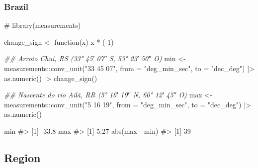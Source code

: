 \documentclass[
  12pt,
  a4paper,
  oneside]{tesesusp}
\newenvironment{Shaded}{\begin{snugshade}}{\end{snugshade}}
\newcommand{\AttributeTok}[1]{\textcolor[rgb]{0.40,0.45,0.13}{#1}}
\newcommand{\CommentTok}[1]{\textcolor[rgb]{0.37,0.37,0.37}{#1}}
\newcommand{\ControlFlowTok}[1]{\textcolor[rgb]{0.00,0.23,0.31}{#1}}
\newcommand{\DecValTok}[1]{\textcolor[rgb]{0.68,0.00,0.00}{#1}}
\newcommand{\DocumentationTok}[1]{\textcolor[rgb]{0.37,0.37,0.37}{\textit{#1}}}
\newcommand{\FunctionTok}[1]{\textcolor[rgb]{0.28,0.35,0.67}{#1}}
\newcommand{\NormalTok}[1]{\textcolor[rgb]{0.00,0.23,0.31}{#1}}
\newcommand{\OtherTok}[1]{\textcolor[rgb]{0.00,0.23,0.31}{#1}}
\newcommand{\SpecialCharTok}[1]{\textcolor[rgb]{0.37,0.37,0.37}{#1}}
\newcommand{\StringTok}[1]{\textcolor[rgb]{0.13,0.47,0.30}{#1}}
\begin{document}
\hypertarget{brazil-1}{%
\subsubsection{Brazil}\label{brazil-1}}

\begin{Shaded}
\begin{Highlighting}[numbers=left,,]
\CommentTok{\# library(measurements)}

\NormalTok{change\_sign }\OtherTok{\textless{}{-}} \ControlFlowTok{function}\NormalTok{(x) x }\SpecialCharTok{*}\NormalTok{ (}\SpecialCharTok{{-}}\DecValTok{1}\NormalTok{)}

\DocumentationTok{\#\# Arroio Chuí, RS (33° 45′ 07″ S, 53° 23′ 50″ O)}
\NormalTok{min }\OtherTok{\textless{}{-}} 
\NormalTok{  measurements}\SpecialCharTok{::}\FunctionTok{conv\_unit}\NormalTok{(}\StringTok{"33 45 07"}\NormalTok{, }\AttributeTok{from =} \StringTok{"deg\_min\_sec"}\NormalTok{, }\AttributeTok{to =} \StringTok{"dec\_deg"}\NormalTok{) }\SpecialCharTok{|\textgreater{}}
  \FunctionTok{as.numeric}\NormalTok{() }\SpecialCharTok{|\textgreater{}}
  \FunctionTok{change\_sign}\NormalTok{()}

\DocumentationTok{\#\# Nascente do rio Ailã, RR (5° 16′ 19″ N, 60° 12′ 45″ O)}
\NormalTok{max }\OtherTok{\textless{}{-}} 
\NormalTok{  measurements}\SpecialCharTok{::}\FunctionTok{conv\_unit}\NormalTok{(}\StringTok{"5 16 19"}\NormalTok{, }\AttributeTok{from =} \StringTok{"deg\_min\_sec"}\NormalTok{, }\AttributeTok{to =} \StringTok{"dec\_deg"}\NormalTok{) }\SpecialCharTok{|\textgreater{}}
  \FunctionTok{as.numeric}\NormalTok{()}

\NormalTok{min}
\CommentTok{\#\textgreater{} [1] {-}33.8}
\NormalTok{max}
\CommentTok{\#\textgreater{} [1] 5.27}
\FunctionTok{abs}\NormalTok{(max }\SpecialCharTok{{-}}\NormalTok{ min)}
\CommentTok{\#\textgreater{} [1] 39}
\end{Highlighting}
\end{Shaded}

\hypertarget{region}{%
\subsection{Region}\label{region}}
\end{document}
